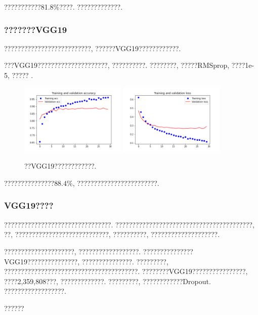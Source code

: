 \documentclass[lang=cn,11pt]{elegantpaper}
\begin{document}
???????????81.8\%????. ?????????????.

\subsubsection{???????VGG19}
??????????????????????????, ??????VGG19????????????. 

???VGG19?????????????????????, ??????????. ????????, ?????RMSprop, ????1e-5, ????? .
\begin{figure}[htbp]
	\centering
	  \includegraphics[width=0.45\textwidth]{VGG_classify_1}
	  \includegraphics[width=0.45\textwidth]{VGG_classify_2}
	  \caption{??VGG19????????????. \label{fig:ab1}}
	\end{figure}

???????????????$88.4\%$, ????????????????????????. 
\subsubsection{VGG19????}

????????????????????????????????. ?????????????????????????????????????????, ??, ????????????????????????????, ??????????, ????????????????????. 

?????????????????????, ??????????????????. ???????????????VGG19???????????????, ???????????????. ?????????, ????????????????????????????????????????. ????????VGG19????????????????, ????2,359,808???, ?????????????. ?????????, ????????????Dropout. ??????????????????.

?????? 
\end{document}
